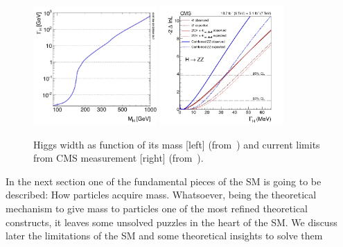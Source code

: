\begin{figure}[!Hhtbp]
  \begin{center}
    \includegraphics[width=0.42\textwidth]{figs/u0g5o.png}
    \includegraphics[width=0.42\textwidth]{figs/AllFitPaper_30_04_14_MeV.png}
    \caption{Higgs width as function of its mass [left] (from~\cite{Dittmaier:2011ti, Dittmaier:2012vm, Heinemeyer:2013tqa, HIGGSXSWG}) and current limits from CMS measurement [right] (from~\cite{Khachatryan:2014iha}).}
    \label{fig:WidthHiggs}
  \end{center}
\end{figure}

In the next section one of the fundamental pieces of the SM is going to be described: How particles acquire mass. Whatsoever, being the theoretical mechanism to give mass to particles one of the most refined theoretical constructs, it leaves some unsolved puzzles in the heart of the SM. We discuss later the limitations of the SM and some theoretical insights to solve them 



